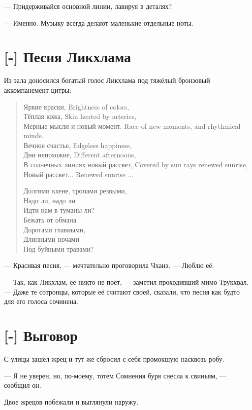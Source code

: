 --- Придерживайся основной линии, лавируя в деталях?

--- Именно.
Музыку всегда делают маленькие отдельные ноты.

\section{[-] Песня Ликхлама}

Из зала доносился богатый голос Ликхлама под тяжёлый бронзовый аккомпанемент цитры:

\begin{verse}
{Яркие краски,}
{Brightness of colors,}\\
{Тёплая кожа,}
{Skin heated by arteries,}\\
{Мерные мысли и новый момент.}
{Race of new moments, and rhythmical minds. }\\
{Вечное счастье,}
{Edgeless happiness,}\\
{Дни непохожие,}
{Different afternoons,}\\
{В солнечных линиях новый рассвет,}
{Covered by sun rays renewed sunrise,}\\
{Новый рассвет...}
{Renewed sunrise ...}

Долгими кхене, тропами резвыми,\\
Надо ли, надо ли\\
Идти нам в туманы ли?\\
Бежать от обмана\\
Дорогами главными,\\
Длинными ночами\\
Под буйными травами?
\end{verse}

--- Красивая песня, --- мечтательно проговорила Чханэ.
--- Люблю её.

--- Так, как Ликхлам, её никто не поёт, --- заметил проходивший мимо Трукхвал.
--- Даже те сотронцы, которые её считают своей, сказали, что песня как будто для его голоса сочинена.

\section{[-] Выговор}

С улицы зашёл жрец и тут же сбросил с себя промокшую насквозь робу.

--- Я не уверен, но, по-моему, тотем Сомнения буря снесла к свиньям, --- сообщил он.

Двое жрецов побежали и выглянули наружу.

